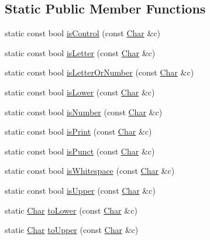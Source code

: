 \subsection*{Static Public Member Functions}
\begin{DoxyCompactItemize}
\item 
static const bool \hyperlink{classprism_1_1_char_a4e9bde03018f2984b3c407a6050b4ec6}{is\+Control} (const \hyperlink{classprism_1_1_char}{Char} \&c)
\item 
static const bool \hyperlink{classprism_1_1_char_afe00726b5485afb851457fb921d78b54}{is\+Letter} (const \hyperlink{classprism_1_1_char}{Char} \&c)
\item 
static const bool \hyperlink{classprism_1_1_char_aaba5608d173adc3cd508f693dda4d83a}{is\+Letter\+Or\+Number} (const \hyperlink{classprism_1_1_char}{Char} \&c)
\item 
static const bool \hyperlink{classprism_1_1_char_a6a22ff7571912b84bddb9f7f1cff8a51}{is\+Lower} (const \hyperlink{classprism_1_1_char}{Char} \&c)
\item 
static const bool \hyperlink{classprism_1_1_char_a9005b39ac1f6c624a1c558536cbd7684}{is\+Number} (const \hyperlink{classprism_1_1_char}{Char} \&c)
\item 
static const bool \hyperlink{classprism_1_1_char_a8cbfa36d59a89819bd8fe4a24a934781}{is\+Print} (const \hyperlink{classprism_1_1_char}{Char} \&c)
\item 
static const bool \hyperlink{classprism_1_1_char_adfd8b143172c4ee1ff88bc16266044e9}{is\+Punct} (const \hyperlink{classprism_1_1_char}{Char} \&c)
\item 
static const bool \hyperlink{classprism_1_1_char_a02d806654c2340082cc06f004397d107}{is\+Whitespace} (const \hyperlink{classprism_1_1_char}{Char} \&c)
\item 
static const bool \hyperlink{classprism_1_1_char_a155caec5ef136f9c69d63f2558188800}{is\+Upper} (const \hyperlink{classprism_1_1_char}{Char} \&c)
\item 
static \hyperlink{classprism_1_1_char}{Char} \hyperlink{classprism_1_1_char_a616e4884f2864a30169c7e861b0a26de}{to\+Lower} (const \hyperlink{classprism_1_1_char}{Char} \&c)
\item 
static \hyperlink{classprism_1_1_char}{Char} \hyperlink{classprism_1_1_char_adacef2e19373597de680679ae9dddd6b}{to\+Upper} (const \hyperlink{classprism_1_1_char}{Char} \&c)
\end{DoxyCompactItemize}
